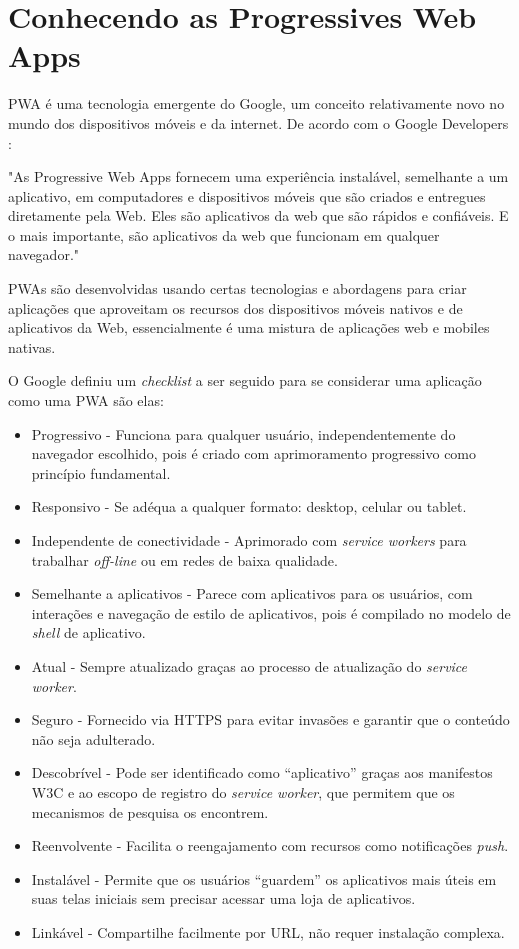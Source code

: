 \chapter{\textbf{Conhecendo as Progressives Web Apps}}

\ac{PWA} é uma tecnologia emergente do Google, um conceito relativamente novo no mundo dos dispositivos móveis e da internet. De acordo com o Google Developers \cite{pwa}: \begin{citacao}
"As Progressive Web Apps fornecem uma experiência instalável, semelhante a um aplicativo, em computadores e dispositivos móveis que são criados e entregues diretamente pela Web. Eles são aplicativos da web que são rápidos e confiáveis. E o mais importante, são aplicativos da web que funcionam em qualquer navegador."
\end{citacao}

 \ac{PWA}s são desenvolvidas usando certas tecnologias e abordagens para criar aplicações que aproveitam os recursos dos dispositivos móveis nativos e de aplicativos da Web, essencialmente é uma mistura de aplicações web e mobiles nativas.

O Google definiu um \textit{checklist} a ser seguido para se considerar uma aplicação como uma \ac{PWA} são elas:

\begin{itemize}
	\item Progressivo - Funciona para qualquer usuário, independentemente do navegador escolhido, pois é criado com aprimoramento progressivo como princípio fundamental.
	\item Responsivo - Se adéqua a qualquer formato: desktop, celular ou tablet.
	\item Independente de conectividade - Aprimorado com \textit{service workers} para trabalhar \textit{off-line} ou em redes de baixa qualidade.
	\item Semelhante a aplicativos - Parece com aplicativos para os usuários, com interações e navegação de estilo de aplicativos, pois é compilado no modelo de \textit{shell} de aplicativo.
	\item Atual - Sempre atualizado graças ao processo de atualização do \textit{service worker}.
	\item Seguro - Fornecido via HTTPS para evitar invasões e garantir que o conteúdo não seja adulterado.
	\item Descobrível - Pode ser identificado como “aplicativo” graças aos manifestos W3C e ao escopo de registro do \textit{service worker}, que permitem que os mecanismos de pesquisa os encontrem.
	\item Reenvolvente - Facilita o reengajamento com recursos como notificações \textit{push}.
	\item Instalável - Permite que os usuários “guardem” os aplicativos mais úteis em suas telas iniciais sem precisar acessar uma loja de aplicativos.
	\item Linkável - Compartilhe facilmente por URL, não requer instalação complexa.
\end{itemize}

